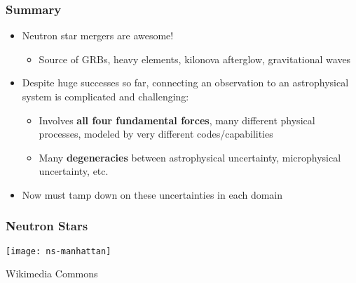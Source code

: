 \documentclass[]{beamer}
\newcommand{\backupbegin}{
   \newcounter{finalframe}
   \setcounter{finalframe}{\value{framenumber}}
}
\begin{document}
\begin{frame}
  \frametitle{Summary}
  \begin{itemize}
  \item Neutron star mergers are awesome!
    \begin{itemize}
    \item Source of GRBs, heavy elements, kilonova afterglow,
      gravitational waves
    \end{itemize}
  \item Despite huge successes so far, connecting an observation to an
    astrophysical system is complicated and challenging:
    \begin{itemize}
    \item Involves \textbf{all four fundamental forces}, many different physical processes, modeled by very different codes/capabilities
    \item Many \textbf{degeneracies} between astrophysical uncertainty, microphysical uncertainty, etc.
    \end{itemize}
  \item Now must tamp down on these uncertainties in each domain
  \end{itemize}
\end{frame}

\backupbegin

\begin{frame}
  \frametitle{Neutron Stars}
  \begin{center}
    \texttt{[image: ns-manhattan]}
  \end{center}
  Wikimedia Commons
\end{frame}
\end{document}
